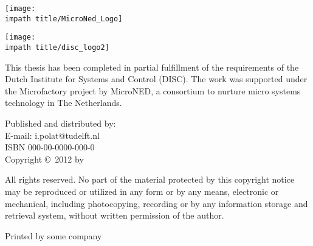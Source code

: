 \vspace*{\fill}


\noindent
{
\flushleft\texttt{[image: \\impath title/MicroNed\_Logo]}\hspace*{0.75cm}\vspace{2em}

\texttt{[image: \\impath title/disc\_logo2]}

\vspace{1em}


\parbox{\textwidth}{\noindent This thesis has been completed in partial fulfillment of
the requirements of the Dutch Institute for Systems and Control
(DISC). The work was supported under the Microfactory project by
MicroNED, a consortium to nurture micro systems technology in
The Netherlands.
}
\vspace*{\fill}


Published and distributed by: \theauthor \\
E-mail: i.polat@tudelft.nl\\

\bigskip{}
ISBN 000-00-0000-000-0\\
Copyright \copyright~2012 by \theauthor
}


\bigskip{}
\noindent All rights reserved. No part of the material protected by
this copyright notice may be reproduced or utilized in any form or
by any means, electronic or mechanical, including photocopying,
recording or by any information storage and retrieval system,
without written permission of the author.

\bigskip{}

\noindent Printed by some company
